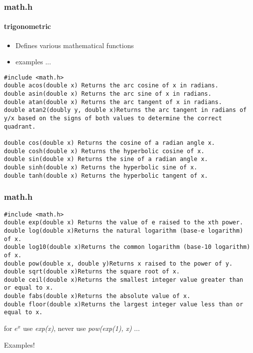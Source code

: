 \documentclass[10pt]{beamer}
\begin{document}
\begin{frame}[fragile]
  \frametitle{math.h}
  \framesubtitle{trigonometric}
  \begin{itemize}
  \item Defines various mathematical functions
  \item examples ...
  \end{itemize}

\begin{lstlisting}
#include <math.h>
double acos(double x) Returns the arc cosine of x in radians.
double asin(double x) Returns the arc sine of x in radians.
double atan(double x) Returns the arc tangent of x in radians.
double atan2(doubly y, double x)Returns the arc tangent in radians of y/x based on the signs of both values to determine the correct quadrant.

double cos(double x) Returns the cosine of a radian angle x.
double cosh(double x) Returns the hyperbolic cosine of x.
double sin(double x) Returns the sine of a radian angle x.
double sinh(double x) Returns the hyperbolic sine of x.
double tanh(double x) Returns the hyperbolic tangent of x.
\end{lstlisting}

\end{frame}

\begin{frame}[fragile]
  \frametitle{math.h}

\begin{lstlisting}
#include <math.h>
double exp(double x) Returns the value of e raised to the xth power.
double log(double x)Returns the natural logarithm (base-e logarithm) of x.
double log10(double x)Returns the common logarithm (base-10 logarithm) of x.
double pow(double x, double y)Returns x raised to the power of y.
double sqrt(double x)Returns the square root of x.
double ceil(double x)Returns the smallest integer value greater than or equal to x.
double fabs(double x)Returns the absolute value of x.
double floor(double x)Returns the largest integer value less than or equal to x.

\end{lstlisting}

for $e^x$ use \textit{exp(x)}, never use \textit{pow(exp(1), x)} ...

Examples!

\end{frame}
\end{document}
